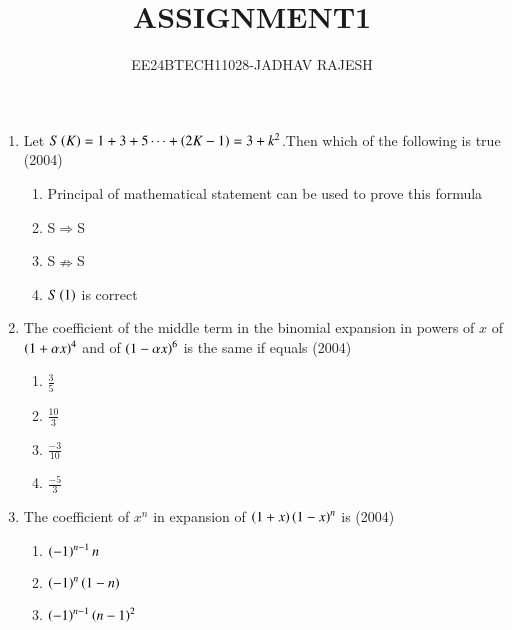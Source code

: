 \documentclass[journal,12pt,twocolumn]{IEEEtran}
\theoremstyle{remark}
\begin{document}

\vspace{3cm}

\title{ASSIGNMENT1}
\author{EE24BTECH11028-JADHAV RAJESH}
\maketitle
\newpage
\bigskip
\begin{enumerate}
    \item Let $S\left(K\right)=1+3+5\dots+\left(2K-1\right)=3+k^2$.Then which of the following 
              is true
              \hfill(2004)
    \begin{enumerate}
        \item Principal of mathematical statement can be used to prove this formula\\
        \item S$\Rightarrow$S\\
        \item S$\nRightarrow$S\\
        \item $S\left(1\right)$ is correct\\
    \end{enumerate}
    \item The coefficient of the middle term in the binomial expansion in powers of $x$ of $\left(1+\alpha x\right)^{4}$ and of $\left(1-\alpha x\right)^6$ is the same if equals
         \hfill(2004)
    \begin{enumerate}
         \item$\frac{3}{5}$\\
         \item$\frac{10}{3}$\\
         \item$\frac{-3}{10}$\\
         \item$\frac{-5}{3}$\\
    \end{enumerate}
    \item The coefficient of $x^{n}$ in expansion of $\left(1+x\right)\left(1-x\right)^{n}$ is
         \hfill(2004)
    \begin{enumerate}
        \item$\left(-1\right)^{n-1}n$\\
        \item$\left(-1\right)^{n}\left(1-n\right)$\\
        \item$\left(-1\right)^{n-1}\left(n-1\right)^{2}$\\

\end{enumerate}
\end{enumerate}
\end{document}
